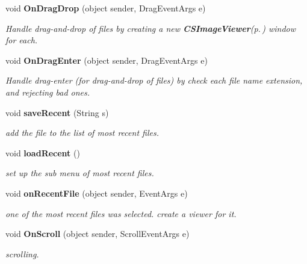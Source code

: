 \begin{CompactItemize}
void {\bf On\-Drag\-Drop} (object sender, Drag\-Event\-Args e)
\begin{CompactList}\small\item\em Handle drag-and-drop of files by creating a new {\bf CSImage\-Viewer}{\rm (p.\,\pageref{class_c_s_image_viewer_1_1_c_s_image_viewer})} window for each. \item\end{CompactList}\item 
void {\bf On\-Drag\-Enter} (object sender, Drag\-Event\-Args e)
\begin{CompactList}\small\item\em Handle drag-enter (for drag-and-drop of files) by check each file name extension, and rejecting bad ones. \item\end{CompactList}\item 
void {\bf save\-Recent} (String s)
\begin{CompactList}\small\item\em add the file to the list of most recent files. \item\end{CompactList}\item 
void {\bf load\-Recent} ()
\begin{CompactList}\small\item\em set up the sub menu of most recent files. \item\end{CompactList}\item 
void {\bf on\-Recent\-File} (object sender, Event\-Args e)
\begin{CompactList}\small\item\em one of the most recent files was selected. create a viewer for it. \item\end{CompactList}\item 
void {\bf On\-Scroll} (object sender, Scroll\-Event\-Args e)
\begin{CompactList}\small\item\em scrolling. \item\end{CompactList}\end{CompactItemize}
